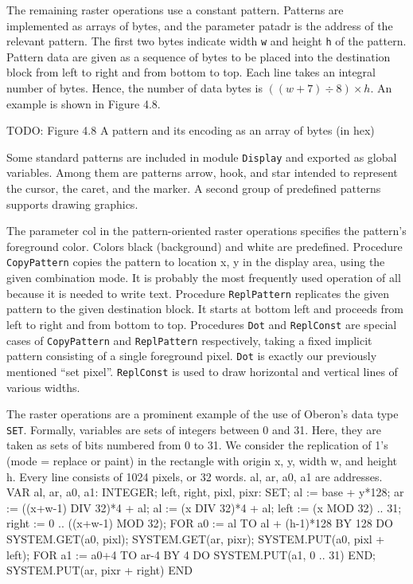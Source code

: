 The remaining raster operations use a constant pattern. Patterns are
implemented as arrays of bytes, and the parameter patadr is the
address of the relevant pattern. The first two bytes indicate width {\tt w\/}
and height {\tt h\/} of the pattern. Pattern data are given as a sequence of
bytes to be placed into the destination block from left to right and
from bottom to top. Each line takes an integral number of
bytes. Hence, the number of data bytes is $((w+7) \div 8) \times h$. An
example is shown in Figure 4.8.

TODO: Figure 4.8 A pattern and its encoding as an array of bytes (in hex)

Some standard patterns are included in module {\tt Display\/} and exported as
global variables. Among them are patterns arrow, hook, and star
intended to represent the cursor, the caret, and the marker. A second
group of predefined patterns supports drawing graphics.

The parameter col in the pattern-oriented raster operations specifies
the pattern's foreground color. Colors black (background) and white
are predefined. Procedure {\tt CopyPattern\/} copies the pattern to location
x, y in the display area, using the given combination mode. It is
probably the most frequently used operation of all because it is
needed to write text. Procedure {\tt ReplPattern\/} replicates the given
pattern to the given destination block. It starts at bottom left and
proceeds from left to right and from bottom to top. Procedures {\tt Dot\/} and
{\tt ReplConst\/} are special cases of {\tt CopyPattern\/} and {\tt ReplPattern\/}
respectively, taking a fixed implicit pattern consisting of a single
foreground pixel. {\tt Dot\/} is exactly our previously mentioned ``set pixel''.
{\tt ReplConst\/} is used to draw horizontal and vertical lines of
various widths.

The raster operations are a prominent example of the use of Oberon's
data type {\tt SET\/}. Formally, variables are sets of integers between 0 and
31. Here, they are taken as sets of bits numbered from 0 to 31. We
consider the replication of 1's (mode = replace or paint) in the
rectangle with origin x, y, width w, and height h. Every line consists
of 1024 pixels, or 32 words. al, ar, a0, a1 are addresses.
\begintt
VAR al, ar, a0, a1: INTEGER;
    left, right, pixl, pixr: SET;
al := base + y*128;
ar := ((x+w-1) DIV 32)*4 + al; al := (x DIV 32)*4 + al;
left := {(x MOD 32) .. 31}; right := {0 .. ((x+w-1) MOD 32)};
FOR a0 := al TO al + (h-1)*128 BY 128 DO
  SYSTEM.GET(a0, pixl); SYSTEM.GET(ar, pixr);
  SYSTEM.PUT(a0, pixl + left);
  FOR a1 := a0+4 TO ar-4 BY 4 DO SYSTEM.PUT(a1, {0 .. 31}) END;
  SYSTEM.PUT(ar, pixr + right)
END
\endtt

